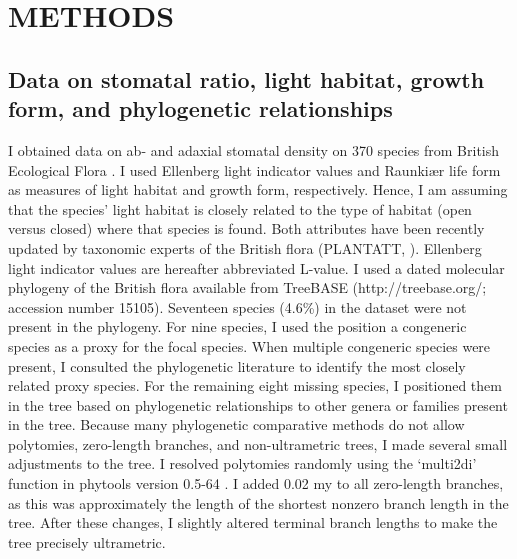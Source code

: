 \documentclass[12pt, oneside]{article}
\newcommand{\pkg}[1]{{\fontseries{b}\selectfont #1}}
\newcommand{\el}{L-value}
\begin{document}


\section*{METHODS}

\subsection*{Data on stomatal ratio, light habitat, growth form, and phylogenetic relationships}

I obtained data on ab- and adaxial stomatal density on 370 species from British Ecological Flora \citep{Fitter_Peat_1994a, BEF}. I used Ellenberg light indicator values \citep{Ellenberg_1974} and Raunki\ae r life form \citep{Raunkiaer_1934} as measures of light habitat and growth form, respectively. Hence, I am assuming that the species' light habitat is closely related to the type of habitat (open versus closed) where that species is found. Both attributes have been recently updated by taxonomic experts of the British flora (PLANTATT, \cite{Hill_etal_2004}). Ellenberg light indicator values are hereafter abbreviated \el. I used a dated molecular phylogeny of the British flora \citep{Lim_etal_2014} available from TreeBASE (http://treebase.org/; accession number 15105). Seventeen species (4.6\%) in the dataset were not present in the phylogeny. For nine species, I used the position a congeneric species as a proxy for the focal species. When multiple congeneric species were present, I consulted the phylogenetic literature to identify the most closely related proxy species. For the remaining eight missing species, I positioned them in the tree based on phylogenetic relationships to other genera or families present in the tree. Because many phylogenetic comparative methods do not allow polytomies, zero-length branches, and non-ultrametric trees, I made several small adjustments to the tree. I resolved polytomies randomly using the `multi2di' function in \pkg{phytools} version 0.5-64 \citep{Revell_2012}. I added 0.02 my to all zero-length branches, as this was approximately the length of the shortest nonzero branch length in the tree. After these changes, I slightly altered terminal branch lengths to make the tree precisely ultrametric.
\end{document}
